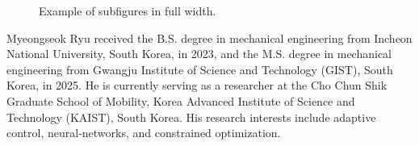 \documentclass[lettersize,journal]{IEEEtran}
\newcommand*{\template}{..}
\begin{document}
\begin{figure}[t]
  \centering
    \hfill
    \caption{
    Example of subfigures in full width.
  }
\label{fig:example:full}
\end{figure}

\appendix




\begin{IEEEbiography}{Myeongseok Ryu}
    received the B.S. degree in mechanical engineering from Incheon National University, South Korea, in 2023, and the M.S. degree in mechanical engineering from Gwangju Institute of Science and Technology (GIST), South Korea, in 2025. 
    He is currently serving as a researcher at the Cho Chun Shik Graduate School of Mobility, Korea Advanced Institute of Science and Technology (KAIST), South Korea.
    His research interests include adaptive control, neural-networks, and constrained optimization.
\end{IEEEbiography}
\end{document}
